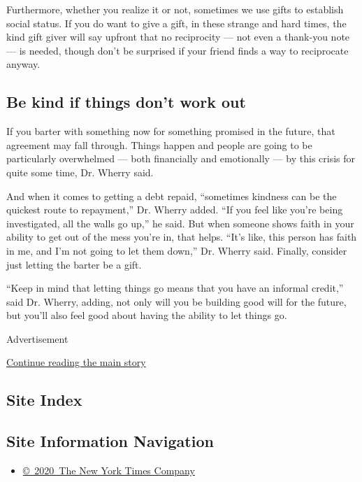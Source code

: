Furthermore, whether you realize it or not, sometimes we use gifts to
establish social status. If you do want to give a gift, in these strange
and hard times, the kind gift giver will say upfront that no reciprocity
--- not even a thank-you note --- is needed, though don't be surprised
if your friend finds a way to reciprocate anyway.

\hypertarget{be-kind-if-things-dont-work-out}{%
\subsection{Be kind if things don't work
out}\label{be-kind-if-things-dont-work-out}}

If you barter with something now for something promised in the future,
that agreement may fall through. Things happen and people are going to
be particularly overwhelmed --- both financially and emotionally --- by
this crisis for quite some time, Dr. Wherry said.

And when it comes to getting a debt repaid, ``sometimes kindness can be
the quickest route to repayment,'' Dr. Wherry added. ``If you feel like
you're being investigated, all the walls go up,'' he said. But when
someone shows faith in your ability to get out of the mess you're in,
that helps. ``It's like, this person has faith in me, and I'm not going
to let them down,'' Dr. Wherry said. Finally, consider just letting the
barter be a gift.

``Keep in mind that letting things go means that you have an informal
credit,'' said Dr. Wherry, adding, not only will you be building good
will for the future, but you'll also feel good about having the ability
to let things go.

Advertisement

\protect\hyperlink{after-bottom}{Continue reading the main story}

\hypertarget{site-index}{%
\subsection{Site Index}\label{site-index}}

\hypertarget{site-information-navigation}{%
\subsection{Site Information
Navigation}\label{site-information-navigation}}

\begin{itemize}
\tightlist
\item
  \href{https://help.nytimes.com/hc/en-us/articles/115014792127-Copyright-notice}{©~2020~The
  New York Times Company}
\end{itemize}

